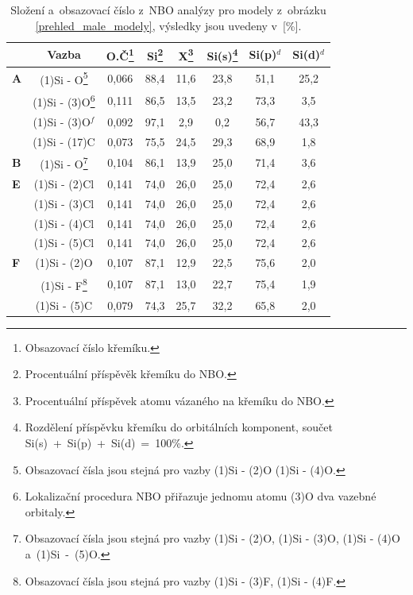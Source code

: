 \documentclass[
digital, %
table,   %
lof,     %
lot,     %
oneside,
]{fithesis3}
\begin{document}
\begin{table}[H]
\begin{minipage}{\textwidth}
\caption{Složení a~obsazovací číslo z~NBO analýzy pro modely z~obrázku \ref{prehled_male_modely}, výsledky jsou uvedeny v~[\%].}
\begin{center}
\begin{tabular}{|l|c|c|c|c|c|c|c|}
\hline
\label{nbo_small} &  Vazba & O.Č\footnote{Obsazovací číslo křemíku.} & Si\footnote{Procentuální příspěvěk křemíku do NBO.} & X\footnote{Procentuální příspěvek atomu vázaného na křemíku do NBO.} & Si(s)\footnote{Rozdělení příspěvku křemíku do orbitálních komponent, součet Si(s)~+~Si(p)~+~Si(d)~=~100\%.} & Si(p)$^d$ &Si(d)$^d$ \\ \hline
\textbf{A} & (1)Si - O\footnote{ Obsazovací čísla jsou stejná pro vazby (1)Si - (2)O (1)Si - (4)O.}  & 0,066 & 88,4  & 11,6  & 23,8  & 51,1  & 25,2  \\ \hline
&  (1)Si - (3)O\footnote{Lokalizační procedura NBO přiřazuje jednomu atomu (3)O dva vazebné orbitaly.} & 0,111 & 86,5  & 13,5  & 23,2  & 73,3  & 3,5  \\ \hline
&  (1)Si - (3)O$^f$ & 0,092 & 97,1  & 2,9  & 0,2  & 56,7  & 43,3  \\ \hline
& (1)Si - (17)C & 0,073 & 75,5  & 24,5  & 29,3  & 68,9  & 1,8  \\ \hline
\textbf{B} & (1)Si - O\footnote{Obsazovací čísla jsou stejná pro vazby (1)Si - (2)O, (1)Si - (3)O, (1)Si - (4)O a~(1)Si~-~(5)O.}  & 0,104 & 86,1  & 13,9  & 25,0  & 71,4  & 3,6  \\ \hline
\textbf{E} & (1)Si - (2)Cl & 0,141 & 74,0  & 26,0  & 25,0  & 72,4  & 2,6  \\ \hline
&  (1)Si - (3)Cl& 0,141 & 74,0  & 26,0  & 25,0  & 72,4  & 2,6  \\ \hline
& (1)Si - (4)Cl & 0,141 & 74,0  & 26,0  & 25,0  & 72,4  & 2,6  \\ \hline
&  (1)Si - (5)Cl & 0,141 & 74,0  & 26,0  & 25,0  & 72,4  & 2,6  \\ \hline
\textbf{F}  & (1)Si - (2)O &0,107 & 87,1  & 12,9  & 22,5  & 75,6  & 2,0  \\ \hline
& (1)Si - F\footnote{ Obsazovací čísla jsou stejná pro vazby (1)Si - (3)F, (1)Si - (4)F.} & 0,107 & 87,1  & 13,0  & 22,7  & 75,4  & 1,9  \\ \hline
& (1)Si - (5)C &0,079 & 74,3  & 25,7  & 32,2  & 65,8  & 2,0  \\ \hline
\end{tabular}
\end{center}
\end{minipage}
\end{table}
\end{document}

